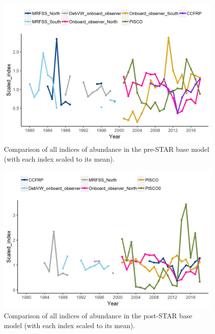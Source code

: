 \documentclass[12pt,]{article}
\begin{document}
\FloatBarrier

\begin{figure}
\centering
\includegraphics{Figures/All_index_compare.png}
\caption{Comparison of all indices of abundance in the pre-STAR base
model (with each index scaled to its mean).
\label{fig:All_index_compare}}
\end{figure}

\begin{figure}
\centering
\includegraphics{Figures/All_index_compare_postSTAR.png}
\caption{Comparison of all indices of abundance in the post-STAR base
model (with each index scaled to its mean).
\label{fig:All_index_compare_postSTAR}}
\end{figure}
\end{document}
